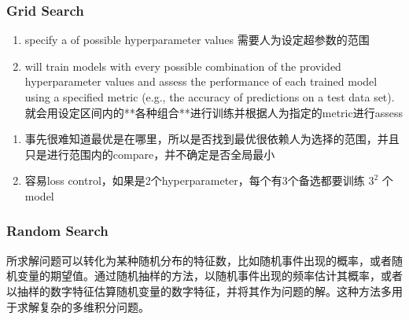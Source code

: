 \documentclass[letterpaper,10pt,english]{sphinxmanual}
\begin{document}
\subsubsection{Grid Search}
\label{\detokenize{AI/main:grid-search}}\begin{enumerate}
%
\item {} 
\sphinxAtStartPar
specify a  of possible hyperparameter values 需要人为设定超参数的范围

\item {} 
\sphinxAtStartPar
{} will train models with every possible combination of the provided hyperparameter values and assess the performance of each trained model using a specified metric (e.g., the accuracy of predictions on a test data set).  就会用设定区间内的**各种组合**进行训练并根据人为指定的metric进行assess

\end{enumerate}

\sphinxAtStartPar
{}
\begin{enumerate}
%
\item {} 
\sphinxAtStartPar
事先很难知道最优是在哪里，所以是否找到最优很依赖人为选择的范围，并且只是进行范围内的compare，并不确定是否全局最小

\item {} 
\sphinxAtStartPar
容易loss control，如果是2个hyper\sphinxhyphen{}parameter，每个有3个备选都要训练 \(3^2\) 个model

\end{enumerate}


\subsubsection{Random Search}
\label{\detokenize{AI/main:random-search}}
\begin{DUlineblock}{0em}
\item[]  
\item[] 所求解问题可以转化为某种随机分布的特征数，比如随机事件出现的概率，或者随机变量的期望值。通过随机抽样的方法，以随机事件出现的频率估计其概率，或者以抽样的数字特征估算随机变量的数字特征，并将其作为问题的解。这种方法多用于求解复杂的多维积分问题。
\end{DUlineblock}
\end{document}
